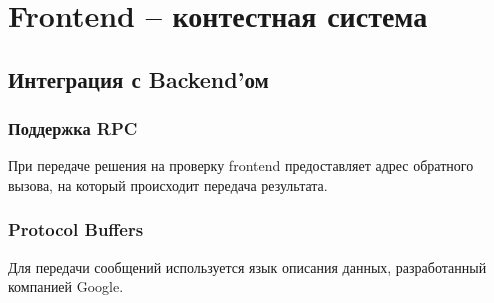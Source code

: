 \chapter{Frontend -- контестная система}

\section{Интеграция с Backend'ом}

\subsection{Поддержка RPC}
При передаче решения на проверку frontend предоставляет адрес обратного вызова,
на который происходит передача результата.

\subsection{Protocol Buffers}
Для передачи сообщений используется язык описания данных, разработанный компанией Google.
